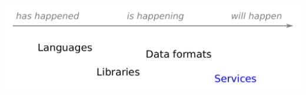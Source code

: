 \documentclass[aspectratio=169]{beamer}
\begin{document}
\begin{frame}{\mbox{ }}
\vspace{0.5 cm}

\begin{center}
\includegraphics[width=0.9\linewidth]{img/topics-4.pdf}
\end{center}
\end{frame}
\end{document}
